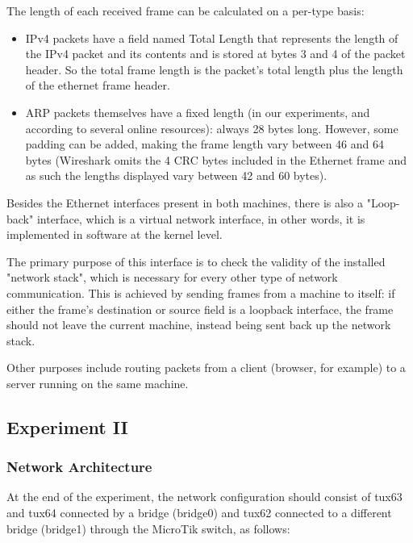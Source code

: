 \documentclass[11pt,a4paper,twocolumn]{article}
\begin{document}
The length of each received frame can be calculated on a per-type basis:

\begin{itemize}
    \item IPv4 packets have a field named Total Length that represents the length of the IPv4 packet and its contents and is stored at bytes 3 and 4 of the packet header. So the total frame length is the packet's total length plus the length of the ethernet frame header.
    \item ARP packets themselves have a fixed length (in our experiments, and according to several online resources): always 28 bytes long. However, some padding can be added, making the frame length vary between 46 and 64 bytes (Wireshark omits the 4 CRC bytes included in the Ethernet frame and as such the lengths displayed vary between 42 and 60 bytes).
\end{itemize}

Besides the Ethernet interfaces present in both machines, there is also a "Loop-back" interface, which is a virtual network interface, in other words, it is implemented in software at the kernel level.

The primary purpose of this interface is to check the validity of the installed "network stack", which is necessary for every other type of network communication.
This is achieved by sending frames from a machine to itself: if either the frame's destination or source field is a loopback interface, the frame should not leave the current machine, instead being sent back up the network stack.

Other purposes include routing packets from a client (browser, for example) to a server running on the same machine.

\subsection{Experiment II}

\subsubsection{Network Architecture}

At the end of the experiment, the network configuration should consist of tux63 and tux64 connected by a bridge (bridge0) and tux62 connected to a different bridge (bridge1) through the MicroTik switch, as follows:
\end{document}
